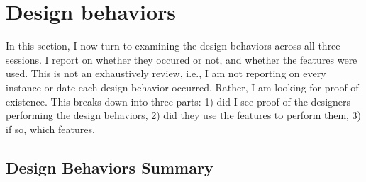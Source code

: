 

\section{Design behaviors}
\label{chapter:evaluation:design-behaviors}
In this section, I now turn to examining the design behaviors across all three sessions. I report on whether they occured or not, and whether the features were used. This is not an exhaustively review, i.e., I am not reporting on every instance or date each design behavior occurred. Rather, I am looking for proof of existence. This breaks down into three parts: 1) did I see proof of the designers performing the design behaviors, 2) did they use the features to perform them, 3) if so, which features.


\subsection{Design Behaviors Summary}

